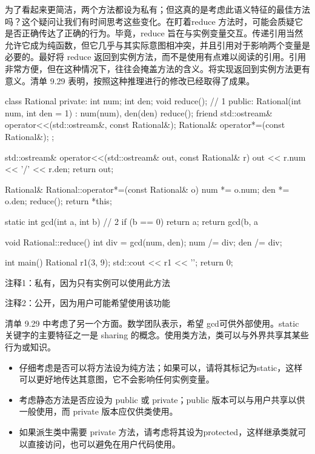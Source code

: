 为了看起来更简洁，两个方法都设为私有；但这真的是考虑此语义特征的最佳方法吗？这个疑问让我们有时间思考这些变化。在盯着reduce 方法时，可能会质疑它是否正确传达了正确的行为。毕竟，reduce 旨在与实例变量交互。传递引用当然允许它成为纯函数，但它几乎与其实际意图相冲突，并且引用对于影响两个变量是必要的。最好将 reduce 返回到实例方法，而不是使用有点难以阅读的引用。引用非常方便，但在这种情况下，往往会掩盖方法的含义。将实现返回到实例方法更有意义。清单 9.29 表明，按照这种推理进行的修改已经取得了成果。


\begin{cpp}
class Rational {
private:
  int num;
  int den;
  void reduce(); // 1
public:
  Rational(int num, int den = 1) : num(num), den(den) { reduce(); }
  friend std::ostream& operator<<(std::ostream&, const Rational&);
  Rational& operator*=(const Rational&);
};

std::ostream& operator<<(std::ostream& out, const Rational& r) {
  out << r.num << '/' << r.den;
  return out;
}

Rational& Rational::operator*=(const Rational& o) {
  num *= o.num;
  den *= o.den;
  reduce();
  return *this;
}

static int gcd(int a, int b) { // 2
  if (b == 0)
    return a;
  return gcd(b, a %
}

void Rational::reduce() {
  int div = gcd(num, den);
  num /= div;
  den /= div;
}

int main() {
  Rational r1(3, 9);
  std::cout << r1 << '\n';
  return 0;
}
\end{cpp}

{\footnotesize
注释1：私有，因为只有实例可以使用此方法

注释2：公开，因为用户可能希望使用该功能
}

清单 9.29 中考虑了另一个方面。数学团队表示，希望 gcd可供外部使用。static 关键字的主要特征之一是 sharing 的概念。使用类方法，类可以与外界共享其某些行为或知识。


\begin{itemize}
\item
仔细考虑是否可以将方法设为纯方法；如果可以，请将其标记为static，这样可以更好地传达其意图，它不会影响任何实例变量。

\item
考虑静态方法是否应设为 public 或 private；public 版本可以与用户共享以供一般使用，而 private 版本应仅供类使用。

\item
如果派生类中需要 private 方法，请考虑将其设为protected，这样继承类就可以直接访问，也可以避免在用户代码使用。
\end{itemize}








